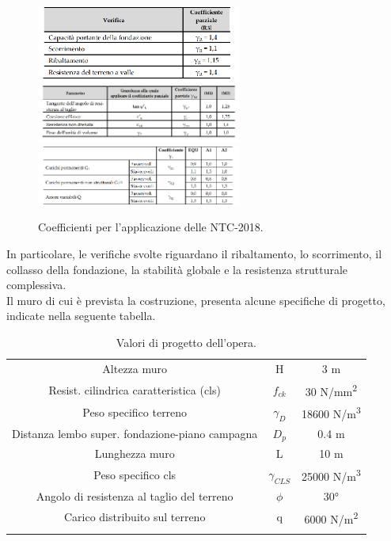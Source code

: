 \begin{figure}[H]
    \centering
    \includegraphics[width=0.6\textwidth]{immagini/coeff_parziali.png} \hfill
    \includegraphics[width=0.6\textwidth]{immagini/parametri_geotecnici.png} \hfill
    \includegraphics[width=0.6\textwidth]{immagini/verifiche_slu.png} \hfill
        \caption{Coefficienti per l'applicazione delle NTC-2018.}
    \label{figure:coeff_NTC2018}
\end{figure}
In particolare, le verifiche svolte riguardano il ribaltamento, lo scorrimento, il collasso della fondazione, la stabilità globale e la resistenza strutturale complessiva.\\
Il muro di cui è prevista la costruzione, presenta alcune specifiche di progetto, indicate nella seguente tabella.
\begin{table}[H] \centering
    \caption{Valori di progetto dell'opera.}
\begin{tabular}{ccc}
    \toprule
Altezza muro & H & 3 m \\
Resist. cilindrica caratteristica (cls) & $f_{ck}$ &  30 \unit{N/mm^2} \\
Peso specifico terreno & $\gamma_D$ &  18600 \unit{N/m^3} \\
Distanza lembo super. fondazione-piano campagna & $D_p$ & 0.4 \unit{m}  \\
Lunghezza muro & L & 10 \unit{m}  \\
Peso specifico cls & $\gamma_{CLS}$ & 25000 \unit{N/m^3}  \\
Angolo di resistenza al taglio del terreno & $\phi$ & 30°  \\
Carico distribuito sul terreno & q & 6000 \unit{N/m^2}  \\
    \bottomrule
\label{table:specifiche}
\end{tabular}

\end{table}

